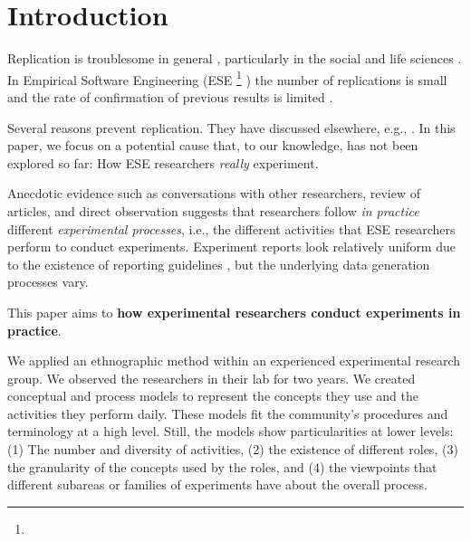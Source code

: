 \section{Introduction}\label{sec-introduction}
Replication is troublesome in general \cite{Klein-2018-many}, particularly in the social and life sciences \cite{Pashler-2012-perspectives,Baker-2016-lid-reproducibility}. In Empirical Software Engineering (ESE%
\footnote{}%
) the number of replications is small \cite{Bezerra-2015-Replication-SE-U-SMS} and the rate of confirmation of previous results is limited \cite{Jorgensen-2016-Incorrects-Results-SEE}.

Several reasons prevent replication. They have discussed elsewhere, e.g., \cite{Miller-2005-replicating-SE-experiments,Demagalhaes-2015-replications-SE,cockburn2020threats,mahmood2018reproducibility,dos2022investigating}. In this paper, we focus on a potential cause that, to our knowledge, has not been explored so far: How ESE researchers \textit{really} experiment. 

Anecdotic evidence such as conversations with other researchers, review of articles, and direct observation suggests that researchers follow \textit{in practice} different \textit{experimental processes}, i.e., the different activities that ESE researchers perform to conduct experiments. Experiment reports look relatively uniform due to the existence of reporting guidelines \cite{Carver-2010-guidelines-replication-SE,Jedlitschka-2008-reporting-experiments-SE}, but the underlying data generation processes vary.

This paper aims to  \textbf{how experimental researchers conduct experiments in practice}. 

We applied an ethnographic method \cite{Sharp-2016-Ethnographic-Studies-ESE,zhang2019ethnographic} within an experienced experimental research group. We observed the researchers in their lab for two years. We created conceptual and process models to represent the concepts they use and the activities they perform daily. These models fit the community's procedures and terminology at a high level. Still, the models show particularities at lower levels: (1) The number and diversity of activities, (2) the existence of different roles, (3) the granularity of the concepts used by the roles, and (4) the viewpoints that different subareas or families of experiments have about the overall process.


